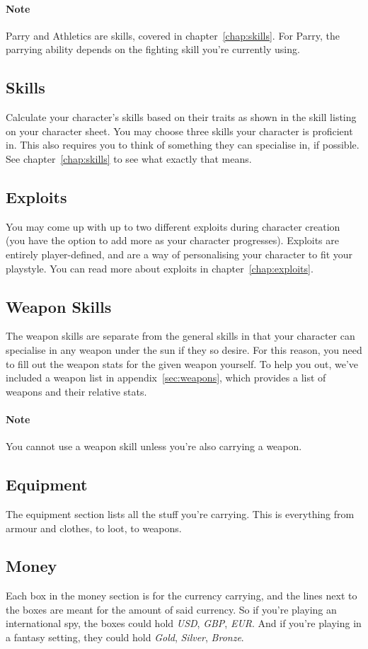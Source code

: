 \paragraph{Note} Parry and Athletics are skills, covered in chapter~\ref{chap:skills}.
For Parry, the parrying ability depends on the fighting skill you're currently using.

\subsection{Skills}
Calculate your character's skills based on their traits as shown in the skill listing on your character sheet.
You may choose three skills your character is proficient in.
This also requires you to think of something they can specialise in, if possible.
See chapter~\ref{chap:skills} to see what exactly that means.

\subsection{Exploits}
You may come up with up to two different exploits during character creation (you have the option to add more as your character progresses).
Exploits are entirely player-defined, and are a way of personalising your character to fit your playstyle.
You can read more about exploits in chapter~\ref{chap:exploits}.

\subsection{Weapon Skills}
The weapon skills are separate from the general skills in that your character can specialise in any weapon under the sun if they so desire.
For this reason, you need to fill out the weapon stats for the given weapon yourself.
To help you out, we've included a weapon list in appendix~\ref{sec:weapons}, which provides a list of weapons and their relative stats.

\paragraph{Note} You cannot use a weapon skill unless you're also carrying a weapon.

\subsection{Equipment}
The equipment section lists all the stuff you're carrying.
This is everything from armour and clothes, to loot, to weapons.

\subsection{Money}
Each box in the money section is for the currency carrying, and the lines next to the boxes are meant for the amount of said currency.
So if you're playing an international spy, the boxes could hold \textit{USD}, \textit{GBP}, \textit{EUR}.
And if you're playing in a fantasy setting, they could hold \textit{Gold}, \textit{Silver}, \textit{Bronze}.
